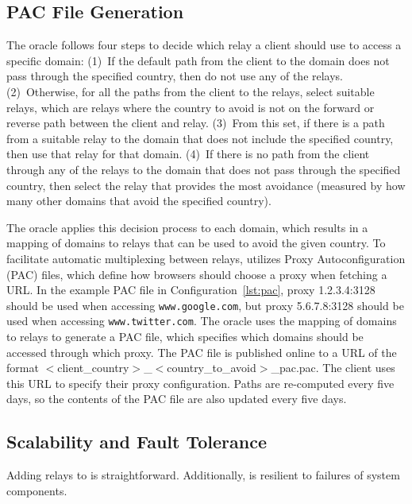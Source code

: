 \subsection{PAC File Generation}
\label{multiplex}
The oracle follows four steps to decide which relay a client should
use to access a specific domain: (1)~If the default path from the
client to the domain does not pass through the specified country, then
do not use any of the relays.  (2)~Otherwise, for all the paths from
the client to the relays, select suitable relays, which are relays where the country 
to avoid is not on the forward or reverse path between the client and 
relay.  (3)~From this set, if there
is a path from a suitable relay to the domain that does not include
the specified country, then use that relay for that domain.  (4)~If
there is no path from the client through any of the relays to the
domain that does not pass through the specified country, then select
the relay that provides the most avoidance (measured by how many other
domains that avoid the specified country).
\begin{figure}[t]
\renewcommand{\lstlistingname}{Configuration}

\vspace*{-0.25in}
\end{figure}
The oracle applies this decision process to each domain, which results
in a mapping of domains to relays that can be used to avoid the given
country.  To facilitate automatic multiplexing between relays,
\system{} utilizes Proxy Autoconfiguration (PAC) files, which define
how browsers should choose a proxy when fetching a URL.  In the
example PAC file in Configuration~\ref{lst:pac}, proxy 1.2.3.4:3128
should be used when accessing {\tt www.google.com}, but proxy
5.6.7.8:3128 should be used when accessing {\tt www.twitter.com}.  The
oracle uses the mapping of domains to relays to generate a PAC file,
which specifies which domains should be accessed through which proxy.
The PAC file is published online to a URL of the format
$<$client\_country$>$\_$<$country\_to\_avoid$>$\_pac.pac.  The client
uses this URL to specify their proxy configuration.  Paths are
re-computed every five days, so the contents of the PAC file are also
updated every five days.

\subsection{Scalability and Fault Tolerance}
Adding relays to \system{} is 
straightforward. Additionally, \system{} is resilient to failures of system components.

